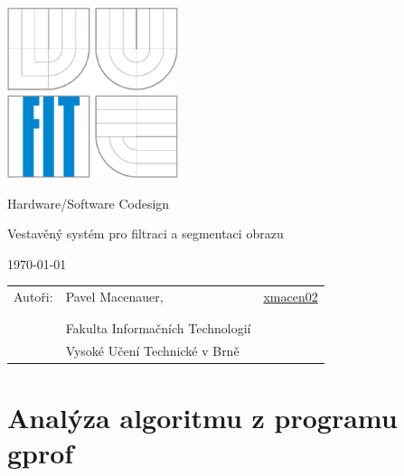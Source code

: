 \documentclass[12pt,a4paper,titlepage,final]{report}
\newcommand\Course{Hardware/Software Codesign}
\newcommand\WorkTitle{Vestavěný systém pro filtraci a segmentaci obrazu}
\newcommand\AuthorA{Pavel Macenauer}
\newcommand\AuthorAEmail{xmacen02}
\newcommand\Faculty{Fakulta Informačních Technologií}
\newcommand\School{Vysoké Učení Technické v Brně}
\begin{document}
	\begin{titlepage}
	\begin{center}
		\includegraphics[height=5cm]{images/logo.eps}
	\end{center}
	\vfill
	\begin{center}
		\begin{Large}
			\Course\\
		\end{Large}
		\bigskip
		\begin{Huge}
			\WorkTitle\\
		\end{Huge}
	\end{center}
	\vfill
	\begin{center}
		\begin{large}
			\today
		\end{large}
	\end{center}
	\vfill
	\begin{flushleft}
		\begin{large}
			\begin{tabular}{lll}
				Autoři: & \AuthorA, & \url{\AuthorAEmail} \\
				        &  \\
				& & \\
				& \Faculty \\
				& \School \\
			\end{tabular}
		\end{large}
	\end{flushleft}
\end{titlepage}		
	
	
\tableofcontents

\newpage
\section{Analýza algoritmu z programu gprof}
\end{document}
